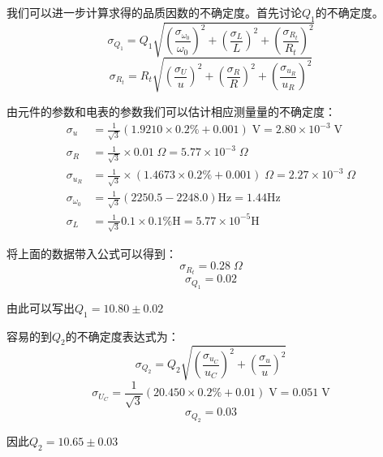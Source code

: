 \documentclass[a4paper]{ctexart}
\def\V{\mathrm{V}}
\begin{document}
    \par 
    我们可以进一步计算求得的品质因数的不确定度。首先讨论$Q_{1}$的不确定度。
    $$
    \sigma_{Q_{1}} = Q_{1}\sqrt{\left(\frac{\sigma_{\omega_{0}}}{\omega_{0}}\right)^{2} + 
    \left(\frac{\sigma_{L}}{L}\right)^{2} + \left(\frac{\sigma_{R_{t}}}{R_{t}}\right)^{2}}
    $$
    $$
    \sigma_{R_{t}} = R_{t}\sqrt{\left(\frac{\sigma_{U}}{u}\right)^{2} + \left(\frac{\sigma_{R}}{R}\right)^{2} + \left(\frac{\sigma_{u_{R}}}{u_{R}}\right)^{2}}
    $$
    \par 
    由元件的参数和电表的参数我们可以估计相应测量量的不确定度：
    \begin{align*}
    \sigma_{u} &= \frac{1}{\sqrt{3}}(1.9210 \times 0.2\% + 0.001)\;\V = 2.80\times 10^{-3}\;\V \\
    \sigma_{R} &= \frac{1}{\sqrt{3}} \times 0.01\;\Omega = 5.77 \times 10^{-3}\;\Omega \\
    \sigma_{u_{R}} &= \frac{1}{\sqrt{3}} \times (1.4673 \times 0.2\% + 0.001)\;\Omega = 2.27 \times 10^{-3}\;\Omega \\ 
    \sigma_{\omega_{0}} &= \frac{1}{\sqrt{3}}(2250.5-2248.0)\mathrm{Hz} = 1.44\mathrm{Hz}\\
    \sigma_{L} &= \frac{1}{\sqrt{3}} 0.1\times 0.1\% \mathrm{H} = 5.77\times 10^{-5}\mathrm{H}
    \end{align*}
    \par 
    将上面的数据带入公式可以得到：
    $$
    \sigma_{R_{t}} = 0.28\;\Omega
    $$
    $$
    \sigma_{Q_{1}} = 0.02
    $$
    \par 
    由此可以写出$Q_{1} = 10.80 \pm 0.02$
    \par 
    容易的到$Q_{2}$的不确定度表达式为：
    $$
    \sigma_{Q_{2}} = Q_{2}\sqrt{\left(\frac{\sigma_{u_{C}}}{u_{C}}\right)^{2} + \left(\frac{\sigma_{u}}{u}\right)^{2}}
    $$
    $$
    \sigma_{U_{C}} = \frac{1}{\sqrt{3}}(20.450 \times 0.2\% + 0.01)\;\V = 0.051\;\V
    $$
    $$
    \sigma_{Q_{2}} = 0.03
    $$
    \par 
    因此$Q_{2} = 10.65 \pm 0.03$\\
\end{document}
